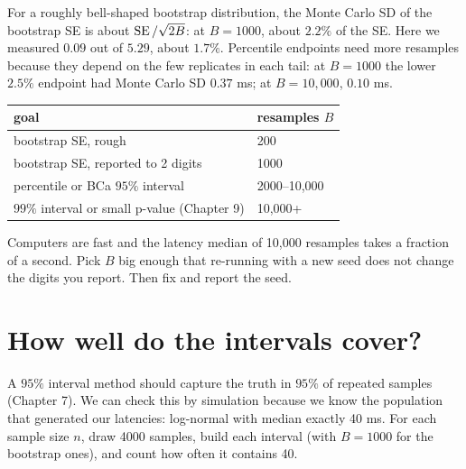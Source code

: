 For a roughly bell-shaped bootstrap distribution, the Monte Carlo SD of the
bootstrap SE is about $\operatorname{SE}/\sqrt{2B}$: at $B=1000$, about $2.2\%$ of the SE.
Here we measured $0.09$ out of $5.29$, about $1.7\%$. Percentile endpoints
need more resamples because they depend on the few replicates in each tail:
at $B = 1000$ the lower $2.5\%$ endpoint had Monte Carlo SD $0.37$ ms; at
$B=10{,}000$, $0.10$ ms.

\begin{center}
\small
\begin{tabular}{l l}
\toprule
goal & resamples $B$\\
\midrule
bootstrap SE, rough & 200\\
bootstrap SE, reported to 2 digits & 1000\\
percentile or BCa $95\%$ interval & 2000--10{,}000\\
$99\%$ interval or small p-value (Chapter 9) & 10{,}000+\\
\bottomrule
\end{tabular}
\end{center}

Computers are fast and the latency median of 10{,}000 resamples takes a
fraction of a second. Pick $B$ big enough that re-running with a new seed
does not change the digits you report. Then fix and report the seed.

\section{How well do the intervals cover?}
\label{sec:boot-coverage}

A $95\%$ interval method should capture the truth in $95\%$ of repeated
samples (Chapter 7). We can check this by simulation because we know the
population that generated our latencies: log-normal with median exactly 40 ms.
For each sample size $n$, draw 4000 samples, build each interval (with
$B = 1000$ for the bootstrap ones), and count how often it contains 40.

